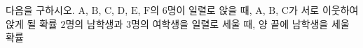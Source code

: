 다음을 구하시오.
 $\mathrm{A}$, $\mathrm{B}$, $\mathrm{C}$, $\mathrm{D}$, $\mathrm{E}$, $\mathrm{F}$의 $6$명이 일렬로 앉을 때, $\mathrm{A}$, $\mathrm{B}$, $\mathrm{C}$가 서로 이웃하여 앉게 될 확률
 $2$명의 남학생과 $3$명의 여학생을 일렬로 세울 때, 양 끝에 남학생을 세울 확률
